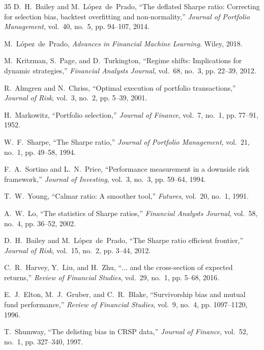\documentclass[10pt,twocolumn]{IEEEtran}
\begin{document}
\begin{thebibliography}{35}
D.~H.~Bailey and M.~L\'opez~de~Prado, ``The deflated Sharpe ratio:
Correcting for selection bias, backtest overfitting and non-normality,''
\emph{Journal of Portfolio Management}, vol.~40, no.~5, pp. 94--107, 2014.

M.~L\'opez~de~Prado, \emph{Advances in Financial Machine Learning}.
Wiley, 2018.

M.~Kritzman, S.~Page, and D.~Turkington, ``Regime shifts: Implications for
dynamic strategies,'' \emph{Financial Analysts Journal}, vol.~68, no.~3,
pp. 22--39, 2012.

R.~Almgren and N.~Chriss, ``Optimal execution of portfolio transactions,''
\emph{Journal of Risk}, vol.~3, no.~2, pp. 5--39, 2001.

H.~Markowitz, ``Portfolio selection,'' \emph{Journal of Finance}, vol.~7,
no.~1, pp. 77--91, 1952.

W.~F.~Sharpe, ``The Sharpe ratio,'' \emph{Journal of Portfolio Management},
vol.~21, no.~1, pp. 49--58, 1994.

F.~A.~Sortino and L.~N.~Price, ``Performance measurement in a downside risk
framework,'' \emph{Journal of Investing}, vol.~3, no.~3, pp. 59--64, 1994.

T.~W.~Young, ``Calmar ratio: A smoother tool,'' \emph{Futures}, vol.~20,
no.~1, 1991.

A.~W.~Lo, ``The statistics of Sharpe ratios,'' \emph{Financial Analysts
Journal}, vol.~58, no.~4, pp. 36--52, 2002.

D.~H.~Bailey and M.~L\'opez~de~Prado, ``The Sharpe ratio efficient frontier,''
\emph{Journal of Risk}, vol.~15, no.~2, pp. 3--44, 2012.

C.~R.~Harvey, Y.~Liu, and H.~Zhu, ``$\ldots$ and the cross-section of expected
returns,'' \emph{Review of Financial Studies}, vol.~29, no.~1, pp. 5--68,
2016.

E.~J.~Elton, M.~J.~Gruber, and C.~R.~Blake, ``Survivorship bias and mutual
fund performance,'' \emph{Review of Financial Studies}, vol.~9, no.~4,
pp. 1097--1120, 1996.

T.~Shumway, ``The delisting bias in CRSP data,'' \emph{Journal of Finance},
vol.~52, no.~1, pp. 327--340, 1997.


\end{thebibliography}
\end{document}
